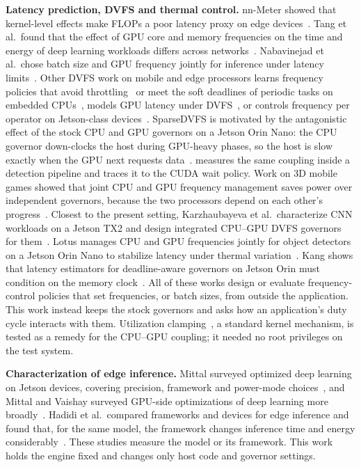 \textbf{Latency prediction, DVFS and thermal control.}
nn-Meter showed that kernel-level effects make FLOPs a poor latency
proxy on edge devices~\cite{zhang2021nnmeter}. Tang et al.\ found that the
effect of GPU core and memory frequencies on the time and energy of
deep learning workloads differs across networks~\cite{tang2019gpudvfs}. Nabavinejad et al.\ chose batch size and
GPU frequency jointly for inference under latency limits~\cite{nabavinejad2022batching}.
Other DVFS work on mobile and edge processors learns frequency policies
that avoid throttling~\cite{kim2021ztt} or meet the soft deadlines of
periodic tasks on embedded CPUs~\cite{zhou2023cpufreq}, models GPU latency under
DVFS~\cite{han2025dvfs}, or controls frequency per operator on
Jetson-class devices~\cite{zhang2026sparsedvfs}. SparseDVFS is
motivated by the antagonistic effect of the stock CPU and GPU governors
on a Jetson Orin Nano: the CPU governor down-clocks the
host during GPU-heavy phases, so the host is slow exactly when the GPU
next requests data~\cite{zhang2026sparsedvfs}. 
measures the same coupling inside a detection pipeline and traces it
to the CUDA wait policy. Work on 3D mobile games showed that joint
CPU and GPU frequency management saves power over independent
governors, because the two processors depend on each other's
progress~\cite{pathania2014cpugpu}. Closest to the present
setting, Karzhaubayeva et al.\ characterize CNN workloads on a Jetson
TX2 and design integrated CPU--GPU DVFS governors for
them~\cite{karzhaubayeva2023cpugpu}. Lotus manages CPU and GPU
frequencies jointly for object detectors on a Jetson Orin Nano to
stabilize latency under thermal variation~\cite{gong2024lotus}. Kang
shows that latency estimators for deadline-aware governors on Jetson
Orin must condition on the memory clock~\cite{kang2026emc}. All of
these works design or evaluate frequency-control policies that set
frequencies, or batch sizes, from outside the application. This work
instead keeps the stock governors and asks how an application's duty
cycle interacts with them. Utilization clamping~\cite{linux2024uclamp}, a standard kernel
mechanism, is tested as a remedy for the CPU--GPU coupling; it needed
no root privileges on the test system.

\textbf{Characterization of edge inference.}
Mittal surveyed optimized deep learning on Jetson devices, covering
precision, framework and power-mode choices~\cite{mittal2019jetson}, and
Mittal and Vaishay surveyed GPU-side optimizations of deep learning more
broadly~\cite{mittal2019gpusurvey}.
Hadidi et al.\ compared frameworks and devices for edge inference and
found that, for the same model, the framework changes inference time
and energy considerably~\cite{hadidi2019edge}. These studies
measure the model or its framework. This work holds the engine fixed
and changes only host code and governor settings.

